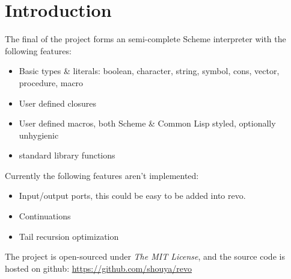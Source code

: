 
\section{Introduction}

The final of the project forms an semi-complete Scheme
interpreter with the following features:
\begin{itemize}
\item{Basic types \& literals: boolean, character, string, symbol,
    cons, vector, procedure, macro}
\item{User defined closures}
\item{User defined macros, both Scheme \& Common Lisp styled, optionally unhygienic}
\item{\RFIVERS standard library functions}
\end{itemize}

Currently the following \RFIVERS features aren't implemented:
\begin{itemize}
\item{Input/output ports, this could be easy to be added into revo.}
\item{Continuations}
\item{Tail recursion optimization}
\end{itemize}



The project is open-sourced under \emph{The MIT License}, and the
source code is hosted on github: \url{https://github.com/shouya/revo}



\newpage


